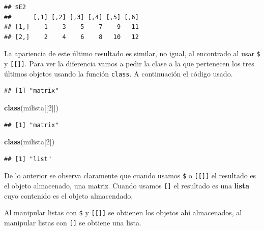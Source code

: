 \documentclass[10pt,]{krantz}
\makeatletter
\newenvironment{Shaded}{\begin{snugshade}}{\end{snugshade}}
\newcommand{\KeywordTok}[1]{\textcolor[rgb]{0.13,0.29,0.53}{\textbf{#1}}}
\newcommand{\DecValTok}[1]{\textcolor[rgb]{0.00,0.00,0.81}{#1}}
\newcommand{\OperatorTok}[1]{\textcolor[rgb]{0.81,0.36,0.00}{\textbf{#1}}}
\newcommand{\NormalTok}[1]{#1}
\newenvironment{kframe}{%
\medskip{}
\setlength{\fboxsep}{.8em}
 \def\at@end@of@kframe{}%
 \ifinner\ifhmode%
  \def\at@end@of@kframe{\end{minipage}}%
  \begin{minipage}{\columnwidth}%
 \fi\fi%
 \def\FrameCommand##1{\hskip\@totalleftmargin \hskip-\fboxsep
 \colorbox{shadecolor}{##1}\hskip-\fboxsep
     \hskip-\linewidth \hskip-\@totalleftmargin \hskip\columnwidth}%
 \MakeFramed {\advance\hsize-\width
   \@totalleftmargin\z@ \linewidth\hsize
   \@setminipage}}%
 {\par\unskip\endMakeFramed%
 \at@end@of@kframe}
\renewenvironment{Shaded}{\begin{kframe}}{\end{kframe}}
\let\BeginKnitrBlock\begin \let\EndKnitrBlock\end
\makeatother
\begin{document}
\begin{verbatim}
## $E2
##      [,1] [,2] [,3] [,4] [,5] [,6]
## [1,]    1    3    5    7    9   11
## [2,]    2    4    6    8   10   12
\end{verbatim}

La apariencia de este último resultado es similar, no igual, al
encontrado al usar \texttt{\$} y \texttt{{[}{[}{]}{]}}. Para ver la
diferencia vamos a pedir la clase a la que pertenecen los tres últimos
objetos usando la función \texttt{class}. A continuación el código
usado.

\begin{Shaded}
\end{Shaded}

\begin{verbatim}
## [1] "matrix"
\end{verbatim}

\begin{Shaded}
\begin{Highlighting}[]
\KeywordTok{class}\NormalTok{(milista[[}\DecValTok{2}\NormalTok{]])}
\end{Highlighting}
\end{Shaded}

\begin{verbatim}
## [1] "matrix"
\end{verbatim}

\begin{Shaded}
\begin{Highlighting}[]
\KeywordTok{class}\NormalTok{(milista[}\DecValTok{2}\NormalTok{])}
\end{Highlighting}
\end{Shaded}

\begin{verbatim}
## [1] "list"
\end{verbatim}

De lo anterior se observa claramente que cuando usamos \texttt{\$} o
\texttt{{[}{[}{]}{]}} el resultado es el objeto almacenado, una matriz.
Cuando usamos \texttt{{[}{]}} el resultado es una \textbf{lista} cuyo
contenido es el objeto almacendado.

\BeginKnitrBlock{rmdwarning}
Al manipular listas con \texttt{\$} y \texttt{{[}{[}{]}{]}} se obtienen
los objetos ahí almacenados, al manipular listas con \texttt{{[}{]}} se
obtiene una lista.
\EndKnitrBlock{rmdwarning}
\end{document}
